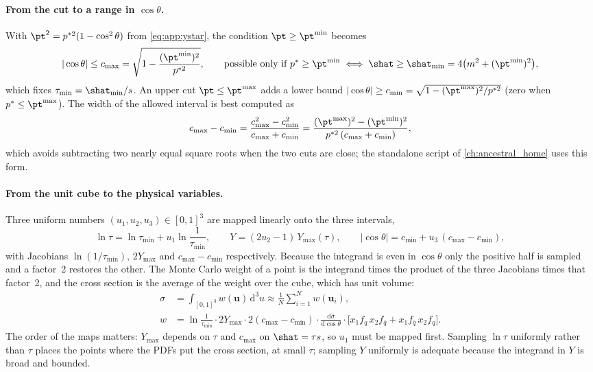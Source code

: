 \paragraph{From the \pt cut to a range in $\cos\theta$.} With
$\pt^2=p^{*2}(1-\cos^2\theta)$ from \cref{eq:app:ystar}, the condition
$\pt\ge\pt^{\min}$ becomes
\begin{equation}
  |\cos\theta|\le c_{\max}=\sqrt{1-\frac{(\pt^{\min})^2}{p^{*2}}},
  \qquad\text{possible only if } p^{*}\ge\pt^{\min}
  \iff \shat\ge\shat_{\min}=4\bigl(m^2+(\pt^{\min})^2\bigr),
  \label{eq:app:cmax}
\end{equation}
which fixes $\tau_{\min}=\shat_{\min}/s$. An upper cut $\pt\le\pt^{\max}$
adds a lower bound $|\cos\theta|\ge c_{\min}=\sqrt{1-(\pt^{\max})^2/p^{*2}}$
(zero when $p^{*}\le\pt^{\max}$). The width of the allowed interval is best
computed as
\begin{equation}
  c_{\max}-c_{\min}=\frac{c_{\max}^2-c_{\min}^2}{c_{\max}+c_{\min}}
  =\frac{(\pt^{\max})^2-(\pt^{\min})^2}{p^{*2}\,(c_{\max}+c_{\min})},
  \label{eq:app:span}
\end{equation}
which avoids subtracting two nearly equal square roots when the two cuts are
close; the standalone script of \cref{ch:ancestral_home} uses this form.

\paragraph{From the unit cube to the physical variables.} Three uniform
numbers $(u_1,u_2,u_3)\in[0,1]^3$ are mapped linearly onto the three
intervals,
\begin{equation}
  \ln\tau=\ln\tau_{\min}+u_1\ln\frac1{\tau_{\min}},\qquad
  Y=(2u_2-1)\,Y_{\max}(\tau),\qquad
  |\cos\theta|=c_{\min}+u_3\,(c_{\max}-c_{\min}),
  \label{eq:app:maps}
\end{equation}
with Jacobians $\ln(1/\tau_{\min})$, $2Y_{\max}$ and $c_{\max}-c_{\min}$
respectively. Because the integrand is even in $\cos\theta$ only the positive
half is sampled and a factor~2 restores the other. The Monte Carlo weight of
a point is the integrand times the product of the three Jacobians times that
factor~2, and the cross section is the average of the weight over the cube,
which has unit volume:
\begin{equation}
\begin{split}
  \sigma&=\int_{[0,1]^3}w(\mathbf u)\,\mathrm{d}^3u\approx\frac1N\sum_{i=1}^Nw(\mathbf u_i),\\
  w&=\ln\frac1{\tau_{\min}}\cdot2Y_{\max}\cdot2(c_{\max}-c_{\min})\cdot
  \frac{\mathrm d\hat\sigma}{\mathrm d\cos\theta}\cdot
  \bigl[x_1f_q\,x_2f_{\bar q}+x_1f_{\bar q}\,x_2f_q\bigr].
\end{split}
  \label{eq:app:weight}
\end{equation}
The order of the maps matters: $Y_{\max}$ depends on $\tau$ and $c_{\max}$
on $\shat=\tau s$, so $u_1$ must be mapped first. Sampling $\ln\tau$
uniformly rather than $\tau$ places the points where the PDFs put the cross
section, at small $\tau$; sampling $Y$ uniformly is adequate because the
integrand in $Y$ is broad and bounded.

